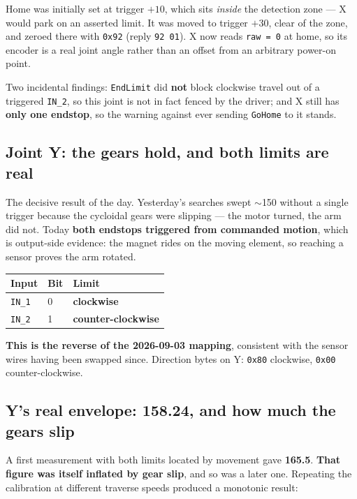 \documentclass[11pt,letterpaper]{article}
\begin{document}
Home was initially set at trigger $+10$\textdegree{}, which sits \emph{inside} the
detection zone --- X would park on an asserted limit. It was moved to
trigger $+30$\textdegree{}, clear of the zone, and zeroed there with \texttt{0x92}
(reply \texttt{92 01}). X now reads \texttt{raw = 0} at home, so its encoder is a
real joint angle rather than an offset from an arbitrary power-on point.

Two incidental findings: \texttt{EndLimit} did \textbf{not} block clockwise travel
out of a triggered \texttt{IN\_2}, so this joint is not in fact fenced by the
driver; and X still has \textbf{only one endstop}, so the warning against ever
sending \texttt{GoHome} to it stands.

\subsection{Joint Y: the gears hold, and both limits are real}
The decisive result of the day. Yesterday's searches swept
$\sim$150\textdegree{} without a single trigger because the cycloidal gears were
slipping --- the motor turned, the arm did not. Today \textbf{both endstops
triggered from commanded motion}, which is output-side evidence: the magnet rides
on the moving element, so reaching a sensor proves the arm rotated.

\begin{center}
\begin{tabular}{lll}
\toprule
\textbf{Input} & \textbf{Bit} & \textbf{Limit} \\ \midrule
\texttt{IN\_1} & 0 & \textbf{clockwise} \\
\texttt{IN\_2} & 1 & \textbf{counter-clockwise} \\
\bottomrule
\end{tabular}
\end{center}

\textbf{This is the reverse of the 2026-09-03 mapping}, consistent with the sensor
wires having been swapped since. Direction bytes on Y: \texttt{0x80} clockwise,
\texttt{0x00} counter-clockwise.

\subsection{Y's real envelope: 158.24\textdegree{}, and how much the gears slip}
\label{sec:y-envelope}
A first measurement with both limits located by movement gave
\textbf{165.5\textdegree{}}. \textbf{That figure was itself inflated by gear
slip}, and so was a later one. Repeating the calibration at different traverse
speeds produced a monotonic result:
\end{document}
